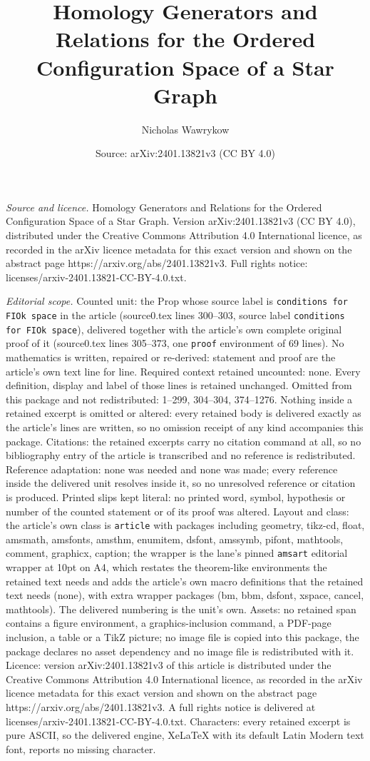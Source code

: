 \documentclass[10pt,a4paper]{amsart}
\title[Homology Generators and Relations for the Ordered Configurat]{Homology Generators and Relations for the Ordered Configuration Space of a Star Graph}
\author{Nicholas Wawrykow}
\date{Source: arXiv:2401.13821v3 (CC BY 4.0)}
\begin{document}
\maketitle

\noindent\emph{Source and licence.} Homology Generators and Relations for the Ordered Configuration Space of a Star Graph. Version arXiv:2401.13821v3 (CC BY 4.0), distributed under the Creative Commons Attribution 4.0 International licence, as recorded in the arXiv licence metadata for this exact version and shown on the abstract page https://arxiv.org/abs/2401.13821v3. Full rights notice: licenses/arxiv-2401.13821-CC-BY-4.0.txt.\par\smallskip

\noindent\textit{Editorial scope.} Counted unit: the Prop whose source label is \texttt{conditions for FIOk space} in the article (source0.tex lines 300--303, source label \texttt{conditions for FIOk space}), delivered together with the article's own complete original proof of it (source0.tex lines 305--373, one \texttt{proof} environment of 69 lines). No mathematics is written, repaired or re-derived: statement and proof are the article's own text line for line. Required context retained uncounted: none. Every definition, display and label of those lines is retained unchanged. Omitted from this package and not redistributed: 1--299, 304--304, 374--1276. Nothing inside a retained excerpt is omitted or altered: every retained body is delivered exactly as the article's lines are written, so no omission receipt of any kind accompanies this package. Citations: the retained excerpts carry no citation command at all, so no bibliography entry of the article is transcribed and no reference is redistributed. Reference adaptation: none was needed and none was made; every reference inside the delivered unit resolves inside it, so no unresolved reference or citation is produced. Printed slips kept literal: no printed word, symbol, hypothesis or number of the counted statement or of its proof was altered. Layout and class: the article's own class is \texttt{article} with packages including geometry, tikz-cd, float, amsmath, amsfonts, amsthm, enumitem, dsfont, amssymb, pifont, mathtools, comment, graphicx, caption; the wrapper is the lane's pinned \texttt{amsart} editorial wrapper at 10pt on A4, which restates the theorem-like environments the retained text needs and adds the article's own macro definitions that the retained text needs (none), with extra wrapper packages (bm, bbm, dsfont, xspace, cancel, mathtools). The delivered numbering is the unit's own. Assets: no retained span contains a figure environment, a graphics-inclusion command, a PDF-page inclusion, a table or a TikZ picture; no image file is copied into this package, the package declares no asset dependency and no image file is redistributed with it. Licence: version arXiv:2401.13821v3 of this article is distributed under the Creative Commons Attribution 4.0 International licence, as recorded in the arXiv licence metadata for this exact version and shown on the abstract page https://arxiv.org/abs/2401.13821v3. A full rights notice is delivered at licenses/arxiv-2401.13821-CC-BY-4.0.txt. Characters: every retained excerpt is pure ASCII, so the delivered engine, XeLaTeX with its default Latin Modern text font, reports no missing character.
\end{document}
